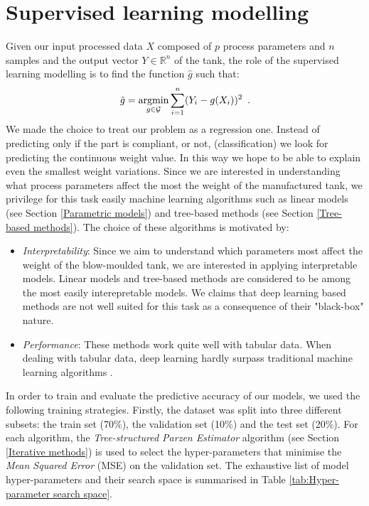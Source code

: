 \section{Supervised learning modelling}

Given our input processed data $X$ composed of $p$ process parameters and $n$ samples and the output vector $Y \in \mathds{R}^{n}$ of the tank, the role of the supervised learning modelling is to find the function $\hat{g}$ such that:
%
\begin{equation}
    \hat{g} = \operatorname*{argmin}_{g \in \mathcal{G}} \sum_{i=1}^n (Y_{i} - g(X_{i}))^{2} 
    \enspace.
\end{equation}
%
We made the choice to treat our problem as a regression one. Instead of predicting only if the part is compliant, or not, (classification) we look for predicting the continuous weight value. In this way we hope to be able to explain even the smallest weight variations. Since we are interested in understanding what process parameters affect the most the weight of the manufactured tank, we privilege for this task easily machine learning algorithms such as linear models (see Section \ref{Parametric models}) and tree-based methods (see Section \ref{Tree-based methods}). The choice of these algorithms is motivated by:
%
\begin{itemize}
    \item \textit{Interpretability}: Since we aim to understand which parameters most affect the weight of the blow-moulded tank, we are interested in applying interpretable models. Linear models and tree-based methods are considered to be among the most easily interepretable models. We claims that deep learning based methods are not well suited for this task as a consequence of their "black-box" nature.
    \item \textit{Performance}: These methods work quite well with tabular data. When dealing with tabular data, deep learning hardly surpass traditional machine learning algorithms \citep{shwartz2021tabular}. 
\end{itemize}
%
In order to train and evaluate the predictive accuracy of our models, we used the following training strategies. Firstly, the dataset was split into three different subsets: the train set (70\%), the validation set (10\%) and the test set (20\%). For each algorithm, the \textit{Tree-structured Parzen Estimator} algorithm (see Section \ref{Iterative methods}) is used to select the hyper-parameters that minimise the \textit{Mean Squared Error} (MSE) on the validation set.
The exhaustive list of model hyper-parameters and their search space is summarised in Table \ref{tab:Hyper-parameter search space}.

